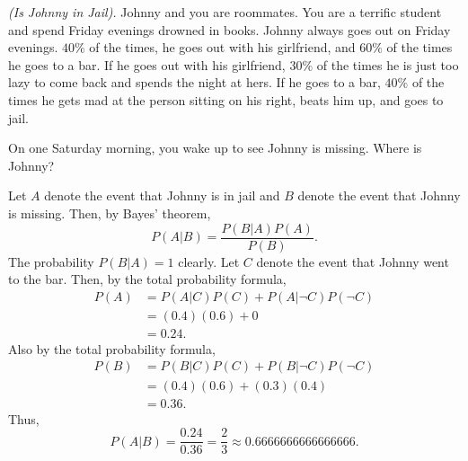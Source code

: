 \begin{problem}[Handout 5, \# 4]
  \emph{(Is Johnny in Jail).} Johnny and you are roommates. You are a
  terrific student and spend Friday evenings drowned in books. Johnny
  always goes out on Friday evenings. \(40\%\) of the times, he goes out
  with his girlfriend, and \(60\%\) of the times he goes to a bar. If he
  goes out with his girlfriend, \(30\%\) of the times he is just too lazy
  to come back and spends the night at hers. If he goes to a bar, \(40\%\)
  of the times he gets mad at the person sitting on his right, beats him
  up, and goes to jail.

  \noindent
  On one Saturday morning, you wake up to see Johnny is missing. Where is
  Johnny?
\end{problem}
\begin{solution}
  Let \(A\) denote the event that Johnny is in jail and \(B\) denote the
  event that Johnny is missing. Then, by Bayes' theorem,
  \[
    P(A|B)=\frac{P(B|A)P(A)}{P(B)}.
  \]
  The probability \(P(B|A)=1\) clearly. Let \(C\) denote the event that
  Johnny went to the bar. Then, by the total probability formula,
  \begin{align*}
    P(A)&=P(A|C)P(C)+P(A|\lnot C)P(\lnot C)\\
        &=(0.4)(0.6)+0\\
        &=0.24.
  \end{align*}
  Also by the total probability formula,
  \begin{align*}
    P(B)&=P(B|C)P(C)+P(B|\lnot C)P(\lnot C)\\
        &=(0.4)(0.6)+(0.3)(0.4)\\
        &=0.36.
  \end{align*}
  Thus,
  \[
    P(A|B)=\frac{0.24}{0.36}=\frac{2}{3}\approx\num{0.6666666666666666}.
  \]
\end{solution}

